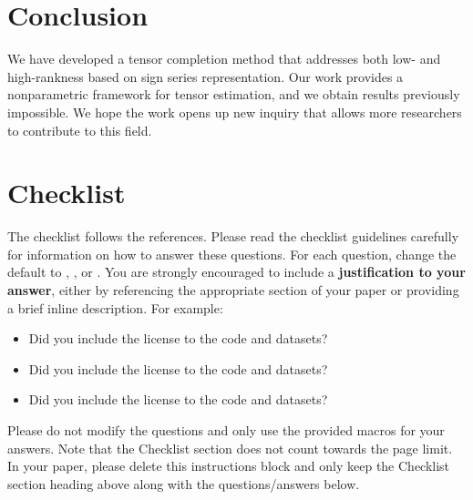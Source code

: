 \documentclass{article}
\theoremstyle{plain}
\theoremstyle{definition}
\begin{document}
\vspace{-.1cm}
\section{Conclusion}
\vspace{-.1cm}
We have developed a tensor completion method that addresses both low- and high-rankness based on sign series representation. Our work provides a nonparametric framework for tensor estimation, and we obtain results  previously impossible.  We hope the work opens up new inquiry that allows more researchers to contribute to this field.
%




\section*{Checklist}

The checklist follows the references.  Please
read the checklist guidelines carefully for information on how to answer these
questions.  For each question, change the default \answerTODO{} to \answerYes{},
\answerNo{}, or \answerNA{}.  You are strongly encouraged to include a {\bf
justification to your answer}, either by referencing the appropriate section of
your paper or providing a brief inline description.  For example:
\begin{itemize}
  \item Did you include the license to the code and datasets? 
  \item Did you include the license to the code and datasets? 
  \item Did you include the license to the code and datasets? \answerNA{}
\end{itemize}
Please do not modify the questions and only use the provided macros for your
answers.  Note that the Checklist section does not count towards the page
limit.  In your paper, please delete this instructions block and only keep the
Checklist section heading above along with the questions/answers below.
\end{document}
